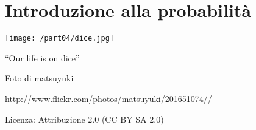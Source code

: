 \part{Introduzione alla probabilità}
\texttt{[image: /part04/dice.jpg]}
 \begin{center}
 {\large ``Our life is on dice''}
 \par
 Foto di matsuyuki
 \par
 \url{http://www.flickr.com/photos/matsuyuki/201651074//}\par
 Licenza: Attribuzione 2.0 (CC BY SA 2.0)\par
 \end{center}
\clearpage
\cleardoublepage
